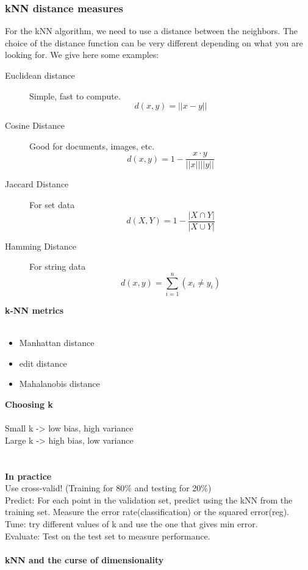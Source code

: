 \subsubsection{kNN distance measures}
For the kNN algorithm, we need to use a distance between the neighbors. The choice of the distance function can be very different depending on what you are looking for. We give here some examples:
\begin{description}
 \item[Euclidean distance] Simple, fast to compute.
 \[
  d(x,y) = ||x-y||
 \]

 \item[Cosine Distance] Good for documents, images, etc.
 \[
  d(x,y) = 1- \frac{x\cdot y}{||x||||y||}
 \]

 \item[Jaccard Distance] For set data
 \[
  d(X,Y) = 1 - \frac{|X \cap Y|}{|X \cup Y|}
 \]

 \item[Hamming Distance] For string data
 \[
  d(x,y) = \sum_{i=1}^{n} \left( x_i \neq y_i \right)
 \]

\end{description}
\textbf{k-NN metrics}
\\\\
\begin{itemize}
 \item Manhattan distance
 \item edit distance
 \item Mahalanobis distance
\end{itemize}
\textbf{Choosing k}
\\\\
Small k -> low bias, high variance \\
Large k -> high bias, low variance \\
\\\\
\textbf{In practice}
\\
Use cross-valid! (Training for 80\% and testing for 20\%) \\
Predict: For each point in the validation set, predict using the kNN from the training set. Measure the error rate(classification) or the squared error(reg). \\
Tune: try different values of k and use the one that gives min error. \\
Evaluate: Test on the test set to measure performance. \\\\
\textbf{kNN and the curse of dimensionality} 
